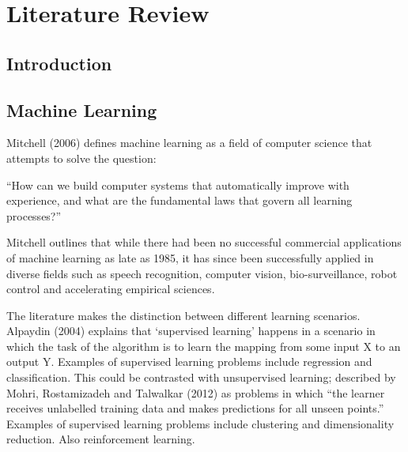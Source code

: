 
\chapter{Literature Review} %

\label{Chapter2} %



\section{Introduction}
\section{Machine Learning}

Mitchell (2006) defines machine learning as a field of computer science that attempts to solve the question:

“How can we build computer systems that automatically improve with experience, and what
are the fundamental laws that govern all learning processes?”

Mitchell outlines that while there had been no successful commercial applications of machine learning as late as 1985, it has since been successfully applied in diverse fields such as speech recognition, computer vision, bio-surveillance, robot control and accelerating empirical sciences.

The literature makes the distinction between different learning scenarios. Alpaydin (2004) explains that ‘supervised learning’ happens in a scenario in which the task of the algorithm is to learn the mapping from some input X to an output Y. Examples of supervised learning problems include regression and classification. This could be contrasted with unsupervised learning; described by Mohri, Rostamizadeh and Talwalkar (2012) as problems in which “the learner receives unlabelled training data and makes predictions for all unseen points.” Examples of supervised learning problems include clustering and dimensionality reduction.
Also reinforcement learning.


